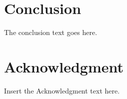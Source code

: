 \documentclass{comnet}%
\begin{document}
\section{Conclusion}
The conclusion text goes here.

\section*{Acknowledgment}

Insert the Acknowledgment text here.




%







\end{document}
